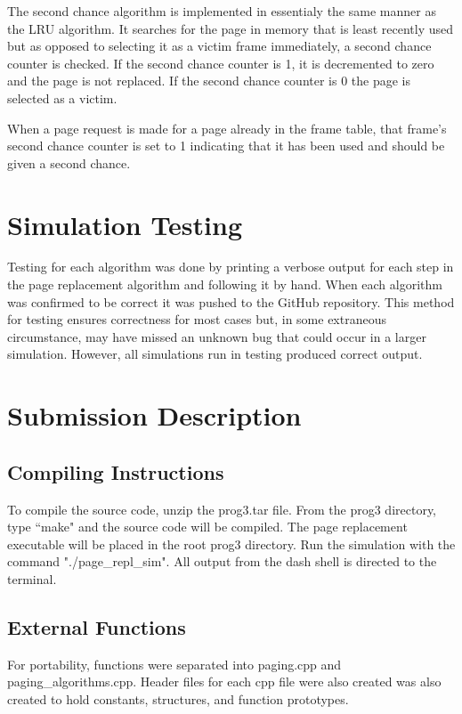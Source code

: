 \begin{multicols}{2}
The second chance algorithm is implemented in essentialy the same manner as the LRU algorithm. It searches for the page in memory that is least recently used but as opposed to selecting it as a victim frame immediately, a second chance counter is checked. If the second chance counter is 1, it is decremented to zero and the page is not replaced. If the second chance counter is 0 the page is selected as a victim. 

When a page request is made for a page already in the frame table, that frame's second chance counter is set to 1 indicating that it has been used and should be given a second chance.

\section{Simulation Testing}\label{testing} 
Testing for each algorithm was done by printing a verbose output for each step in the page replacement algorithm and following it by hand. When each algorithm was confirmed to be correct it was pushed to the GitHub repository. This method for testing ensures correctness for most cases but, in some extraneous circumstance, may have missed an unknown bug that could occur in a larger simulation. However, all simulations run in testing produced correct output.

\section{Submission Description}\label{submission_description}
\subsection{Compiling Instructions}
To compile the source code, unzip the prog3.tar file. From the prog3 directory, type ``make" and the source code will be compiled. The page replacement executable will be placed in the root prog3 directory. Run the simulation with the command "./page\_repl\_sim". All output from the dash shell is directed to the terminal.

\subsection{External Functions}
For portability, functions were separated into paging.cpp and paging\_algorithms.cpp. Header files for each cpp file were also created was also created to hold constants, structures, and function prototypes.

\end{multicols}


